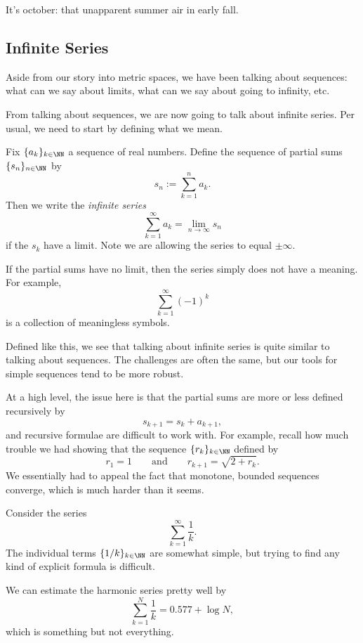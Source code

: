 \documentclass[../notes.tex]{subfiles}
\begin{document}














It's october: that unapparent summer air in early fall.

\subsection{Infinite Series}
Aside from our story into metric spaces, we have been talking about sequences: what can we say about limits, what can we say about going to infinity, etc.

From talking about sequences, we are now going to talk about infinite series. Per usual, we need to start by defining what we mean.
\begin{defi}
	Fix $\{a_k\}_{k\in\NN}$ a sequence of real numbers. Define the sequence of partial sums $\{s_n\}_{n\in\NN}$ by
	\[s_n:=\sum_{k=1}^na_k.\]
	Then we write the \textit{infinite series}
	\[\sum_{k=1}^\infty a_k=\lim_{n\to\infty}s_n\]
	if the $s_k$ have a limit. Note we are allowing the series to equal $\pm\infty.$
\end{defi}
\begin{warn}
	If the partial sums have no limit, then the series simply does not have a meaning. For example,
	\[\sum_{k=1}^\infty(-1)^k\]
	is a collection of meaningless symbols.
\end{warn}
Defined like this, we see that talking about infinite series is quite similar to talking about sequences. The challenges are often the same, but our tools for simple sequences tend to be more robust.

At a high level, the issue here is that the partial sums are more or less defined recursively by
\[s_{k+1}=s_k+a_{k+1},\]
and recursive formulae are difficult to work with. For example, recall how much trouble we had showing that the sequence $\{r_k\}_{k\in\NN}$ defined by
\[r_1=1\qquad\text{and}\qquad r_{k+1}=\sqrt{2+r_k}.\]
We essentially had to appeal the fact that monotone, bounded sequences converge, which is much harder than it seems.
\begin{example}
	Consider the series
	\[\sum_{k=1}^\infty\frac1k.\]
	The individual terms $\{1/k\}_{k\in\NN}$ are somewhat simple, but trying to find any kind of explicit formula is difficult.
\end{example}
\begin{remark}[Nir]
	We can estimate the harmonic series pretty well by
	\[\sum_{k=1}^N\frac1k=0.577+\log N,\]
	which is something but not everything.
\end{remark}
\end{document}
